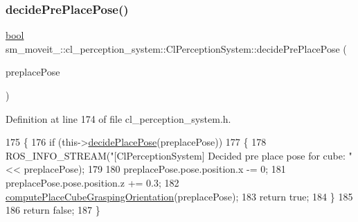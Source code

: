 \mbox{\label{classsm__moveit__4_1_1cl__perception__system_1_1ClPerceptionSystem_a027d06bc7cba5ace251a65bb29777c26}} 
\subsubsection{\texorpdfstring{decide\+Pre\+Place\+Pose()}{decidePrePlacePose()}}
{\footnotesize\ttfamily \hyperlink{classbool}{bool} sm\+\_\+moveit\+\_\+::cl\+\_\+perception\+\_\+system\+::\+Cl\+Perception\+System\+::decide\+Pre\+Place\+Pose (\begin{DoxyParamCaption}\item[{geometry\+\_\+msgs\+::\+Pose\+Stamped \&}]{preplace\+Pose }\end{DoxyParamCaption})\hspace{0.3cm}{\ttfamily [inline]}}



Definition at line 174 of file cl\+\_\+perception\+\_\+system.\+h.


\begin{DoxyCode}
175             \{
176                 \textcolor{keywordflow}{if} (this->\hyperlink{classsm__moveit__4_1_1cl__perception__system_1_1ClPerceptionSystem_af6ff9a225d451bdee312573296ed02a8}{decidePlacePose}(preplacePose))
177                 \{
178                     ROS\_INFO\_STREAM(\textcolor{stringliteral}{"[ClPerceptionSystem] Decided pre place pose for cube: "} << 
      preplacePose);
179 
180                     preplacePose.pose.position.x -= 0;
181                     preplacePose.pose.position.z += 0.3;
182                     \hyperlink{classsm__moveit__4_1_1cl__perception__system_1_1ClPerceptionSystem_afda35b6252c0a5c0692e3ff956609c23}{computePlaceCubeGraspingOrientation}(preplacePose);
183                     \textcolor{keywordflow}{return} \textcolor{keyword}{true};
184                 \}
185 
186                 \textcolor{keywordflow}{return} \textcolor{keyword}{false};
187             \}
\end{DoxyCode}
\mbox{\label{classsm__moveit__4_1_1cl__perception__system_1_1ClPerceptionSystem_a234d70a76bb5bf73f23d420c2b541632}} 
